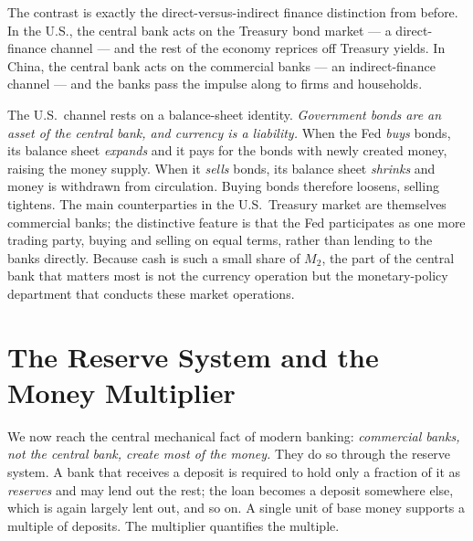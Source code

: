 The contrast is exactly the direct-versus-indirect finance distinction from before. In the U.S., the central bank acts on the Treasury bond market --- a direct-finance channel --- and the rest of the economy reprices off Treasury yields. In China, the central bank acts on the commercial banks --- an indirect-finance channel --- and the banks pass the impulse along to firms and households.

The U.S.\ channel rests on a balance-sheet identity. \emph{Government bonds are an asset of the central bank, and currency is a liability.} When the Fed \emph{buys} bonds, its balance sheet \emph{expands} and it pays for the bonds with newly created money, raising the money supply. When it \emph{sells} bonds, its balance sheet \emph{shrinks} and money is withdrawn from circulation. Buying bonds therefore loosens, selling tightens. The main counterparties in the U.S.\ Treasury market are themselves commercial banks; the distinctive feature is that the Fed participates as one more trading party, buying and selling on equal terms, rather than lending to the banks directly. Because cash is such a small share of $M_2$, the part of the central bank that matters most is not the currency operation but the monetary-policy department that conducts these market operations.

\section{The Reserve System and the Money Multiplier}

We now reach the central mechanical fact of modern banking: \emph{commercial banks, not the central bank, create most of the money.} They do so through the reserve system. A bank that receives a deposit is required to hold only a fraction of it as \emph{reserves} and may lend out the rest; the loan becomes a deposit somewhere else, which is again largely lent out, and so on. A single unit of base money supports a multiple of deposits. The multiplier quantifies the multiple.


